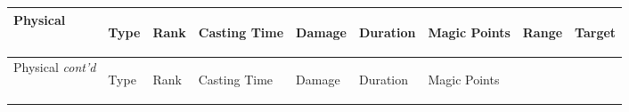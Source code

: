 \documentclass[twoside]{book}
\begin{document}
\begin{longtable}{p{1.25in}lp{2em}p{3em}llp{7em}ll} 
  Physical
  &
  \begin{turn}{70}{Type}\end{turn}
          
  &
  \begin{turn}{70}{Rank}\end{turn}
          
  &
  \begin{turn}{70}{Casting Time}\end{turn}
          
  &
  \begin{turn}{70}{Damage}\end{turn}
          
  &
  \begin{turn}{70}{Duration}\end{turn}
          
  &
  \begin{turn}{70}{Magic Points}\end{turn}
          
  &
  \begin{turn}{70}{Range}\end{turn}
          
  &
  \begin{turn}{70}{Target}\end{turn}
          
  \\
  \hline
  \hline
  \endfirsthead
  Physical \textit{cont'd}
        
  &
  \begin{turn}{70}{Type}\end{turn}
          
  &
  \begin{turn}{70}{Rank}\end{turn}
          
  &
  \begin{turn}{70}{Casting Time}\end{turn}
          
  &
  \begin{turn}{70}{Damage}\end{turn}
          
  &
  \begin{turn}{70}{Duration}\end{turn}
          
  &
  \begin{turn}{70}{Magic Points}\end{turn}
          

\end{longtable}
\end{document}
